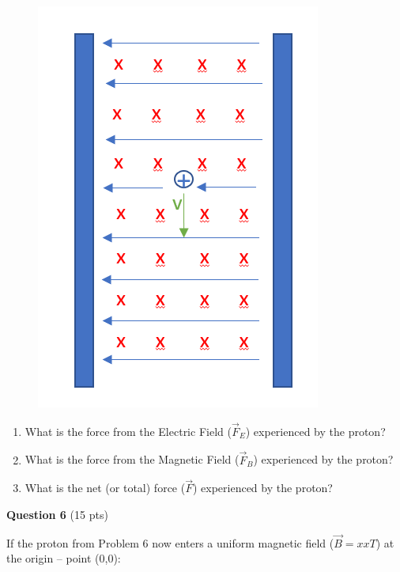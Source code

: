\documentclass[14pt]{report}
\begin{document}
\begin{figure}[H]
\begin{center}
\includegraphics[scale=0.25]{final_4b.png}
\end{center}
\end{figure}

\begin{enumerate}[label=\Alph*]
\item What is the force from the Electric Field ($\vec{F}_E$) experienced by the proton?
\item What is the force from the Magnetic Field ($\vec{F}_B$) experienced by the proton?
\item What is the net (or total) force ($\vec{F}$) experienced by the proton?
\end{enumerate}

\newpage
\textbf{Question 6} (15 pts)

If the proton from Problem 6 now enters a uniform magnetic field ($\vec{B} = xx T$) at the origin -- point (0,0):
\end{document}
